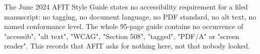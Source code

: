 	{The June 2024 AFIT Style Guide states no accessibility requirement for a
	 filed manuscript: no tagging, no document language, no PDF standard, no alt
	 text, no named conformance level. The whole 95-page guide contains no
	 occurrence of "accessib", "alt text", "WCAG", "Section 508", "tagged",
	 "PDF/A" or "screen reader". This records that AFIT asks for nothing here,
	 not that nobody looked.}

%
%
%
\providecommand{\thesisdocumentdesignator}{AFIT-XXX-MS-XX-X-XXX}
\providecommand{\thesisauthorrank}{Rank, USAF}
\providecommand{\thesisdepartment}{Department of \thesis@program}
\providecommand{\thesisdeanname}{}
\providecommand{\thesisdistributionstatement}{%
	DISTRIBUTION STATEMENT A. APPROVED FOR PUBLIC RELEASE: DISTRIBUTION IS
	UNLIMITED.}

